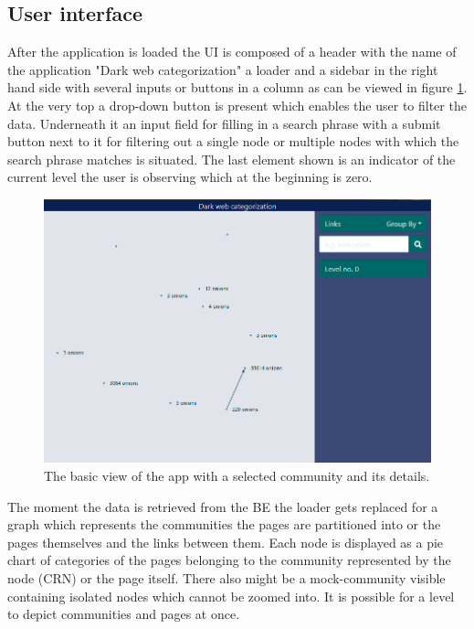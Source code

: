 \subsection{User interface}
After the application is loaded the UI is composed of a header with the name of the application "Dark web categorization" a loader and a sidebar in the right hand side with several inputs or buttons in a column as can be viewed in figure \ref{zeroLevelGraphBasic}. At the very top a drop-down button is present which enables the user to filter the data. Underneath it an input field for filling in a search phrase with a submit button next to it for filtering out a single node or multiple nodes with which the search phrase matches is situated. The last element shown is an indicator of the current level the user is observing which at the beginning is zero. 
\begin{figure}[ht!]
  \centering
  \includegraphics[width=\textwidth]{Images/ZeroLevelGraphBasic.png}
  \caption{The basic view of the app with a selected community and its details.}
  \label{zeroLevelGraphBasic}
\end{figure} 

The moment the data is retrieved from the BE the loader gets replaced for a graph which represents the communities the pages are partitioned into or the pages themselves and the links between them. Each node is displayed as a pie chart of categories of the pages belonging to the community represented by the node (CRN) or the page itself. There also might be a mock-community visible containing isolated nodes which cannot be zoomed into. It is possible for a level to depict communities and pages at once. 

